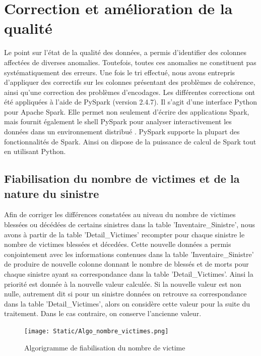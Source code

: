 \section{Correction et am\'elioration de la qualit\'e}
Le point sur l'\'etat de la qualit\'e des donn\'ees, a permis d'identifier des colonnes affect\'ees de diverses anomalies. Toutefois, toutes ces anomalies ne constituent pas syst\'ematiquement des erreurs. Une fois le tri effectu\'e, nous avons entrepris d'appliquer des correctifs sur les colonnes pr\'esentant des probl\`emes de coh\'erence, ainsi qu'une correction des probl\`emes d'encodages. Les diff\'erentes corrections ont \'et\'e appliqu\'ees \`a l'aide de PySpark (version 2.4.7). Il s'agit d'une interface Python pour Apache Spark. Elle permet non seulement d'\'ecrire des applications Spark, mais fournit également le shell PySpark pour analyser interactivement les données dans un environnement distribué \cite{PySpark}. PySpark supporte la plupart des fonctionnalités de Spark. Ainsi on dispose de la puissance de calcul de Spark tout en utilisant Python. \\



\subsection{Fiabilisation du nombre de victimes et de la nature du sinistre}
Afin de corriger les diff\'erences constat\'ees au niveau du nombre de victimes bless\'ees ou d\'ec\'ed\'ees de certains sinistres dans la table 'Inventaire\_Sinistre', nous avons \`a partir de la table 'Detail\_Victimes' recompter pour chaque sinistre le nombre de victimes bless\'ees et d\'eced\'ees. Cette nouvelle donn\'ees a permis conjointement avec les informations contenues dans la table 'Inventaire\_Sinistre' de produire de nouvelle colonne donnant le nombre de bless\'es et de morts pour chaque sinistre ayant sa correspondance dans la table 'Detail\_Victimes'. Ainsi la priorit\'e est donn\'ee \`a la nouvelle valeur calcul\'ee. Si la nouvelle valeur est non nulle, autrement dit si pour un sinistre donn\'ees on retrouve sa correspondance dans la table 'Detail\_Victimes', alors on consid\`ere cette valeur pour la suite du traitement. Dans le cas contraire, on conserve l'ancienne valeur.\\
\begin{figure}[H]
    \begin{center}
      \texttt{[image: Static/Algo\_nombre\_victimes.png]} 
      \end{center}
        \caption{Algorigramme de fiabilisation du nombre de victime}  \label{fig:xray}
\end{figure}

